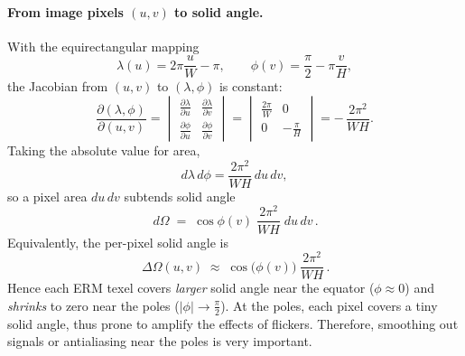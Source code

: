 \documentclass{article}
\begin{document}
\paragraph{From image pixels $(u,v)$ to solid angle.}
With the equirectangular mapping
\[
\lambda(u)=2\pi \frac{u}{W}-\pi,\qquad
\phi(v)=\frac{\pi}{2}-\pi\frac{v}{H},
\]
the Jacobian from $(u,v)$ to $(\lambda,\phi)$ is constant:
\[
\frac{\partial(\lambda,\phi)}{\partial(u,v)}
=
\begin{vmatrix}
\frac{\partial \lambda}{\partial u} & \frac{\partial \lambda}{\partial v}\\[2pt]
\frac{\partial \phi}{\partial u} & \frac{\partial \phi}{\partial v}
\end{vmatrix}
=
\begin{vmatrix}
\frac{2\pi}{W} & 0\\[2pt]
0 & -\frac{\pi}{H}
\end{vmatrix}
= -\,\frac{2\pi^2}{WH}.
\]
Taking the absolute value for area,
\[
d\lambda\, d\phi=\frac{2\pi^2}{WH}\, du\, dv,
\]
so a pixel area $du\,dv$ subtends solid angle
\[
\boxed{\, d\Omega \;=\; \cos\phi(v)\;\frac{2\pi^2}{WH}\; du\, dv\, }.
\]
Equivalently, the per-pixel solid angle is
\[
\boxed{\, \Delta\Omega(u,v) \;\approx\; \cos\!\big(\phi(v)\big)\;\frac{2\pi^2}{WH}\, }.
\]
Hence each ERM texel covers \emph{larger} solid angle near the equator ($\phi\approx 0$) and \emph{shrinks} to zero near the poles ($|\phi|\to \tfrac{\pi}{2}$).
At the poles, each pixel covers a tiny solid angle, thus prone to amplify the effects of flickers. 
Therefore, smoothing out signals or antialiasing near the poles is very important. 
\end{document}
